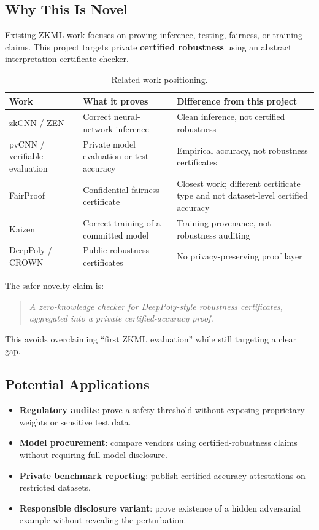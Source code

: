 \documentclass[11pt,a4paper]{article}
\begin{document}
\subsection{Why This Is Novel}

Existing ZKML work focuses on proving inference, testing, fairness, or training claims. This project targets private \textbf{certified robustness} using an abstract interpretation certificate checker.

\begin{table}[H]
\centering
\begin{tabular}{@{}p{3.2cm}p{5cm}p{5.2cm}@{}}
\toprule
\textbf{Work} & \textbf{What it proves} & \textbf{Difference from this project} \\
\midrule
zkCNN / ZEN & Correct neural-network inference & Clean inference, not certified robustness \\
\midrule
pvCNN / verifiable evaluation & Private model evaluation or test accuracy & Empirical accuracy, not robustness certificates \\
\midrule
FairProof & Confidential fairness certificate & Closest work; different certificate type and not dataset-level certified accuracy \\
\midrule
Kaizen & Correct training of a committed model & Training provenance, not robustness auditing \\
\midrule
DeepPoly / CROWN & Public robustness certificates & No privacy-preserving proof layer \\
\bottomrule
\end{tabular}
\caption{Related work positioning.}
\end{table}

The safer novelty claim is:
\begin{quote}
\textit{A zero-knowledge checker for DeepPoly-style robustness certificates, aggregated into a private certified-accuracy proof.}
\end{quote}

This avoids overclaiming ``first ZKML evaluation'' while still targeting a clear gap.

\subsection{Potential Applications}

\begin{itemize}
    \item \textbf{Regulatory audits}: prove a safety threshold without exposing proprietary weights or sensitive test data.
    \item \textbf{Model procurement}: compare vendors using certified-robustness claims without requiring full model disclosure.
    \item \textbf{Private benchmark reporting}: publish certified-accuracy attestations on restricted datasets.
    \item \textbf{Responsible disclosure variant}: prove existence of a hidden adversarial example without revealing the perturbation.
\end{itemize}
\end{document}
